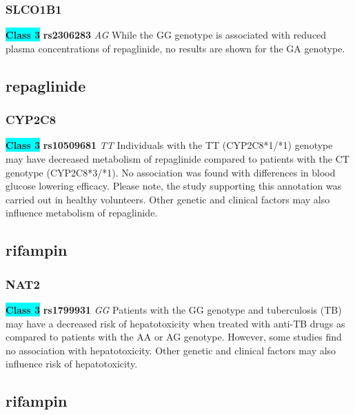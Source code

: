 \documentclass{book}
\begin{document}
\subsubsection{ SLCO1B1 }

\begin{center}
\textbf{\colorbox{cyan} {Class 3}} \textbf{ rs2306283 } \textit{ AG }
While the GG genotype is associated with reduced plasma concentrations of repaglinide, no results are shown for the GA genotype.


\end{center}\subsection{ repaglinide }


\subsubsection{ CYP2C8 }

\begin{center}
\textbf{\colorbox{cyan} {Class 3}} \textbf{ rs10509681 } \textit{ TT }
Individuals with the TT (CYP2C8*1/*1) genotype may have decreased metabolism of repaglinide compared to patients with the CT genotype (CYP2C8*3/*1). No association was found with differences in blood glucose lowering efficacy. Please note, the study supporting this annotation was carried out in healthy volunteers. Other genetic and clinical factors may also influence metabolism of repaglinide.


\end{center}\subsection{ rifampin }


\subsubsection{ NAT2 }

\begin{center}
\textbf{\colorbox{cyan} {Class 3}} \textbf{ rs1799931 } \textit{ GG }
Patients with the GG genotype and tuberculosis (TB) may have a decreased risk of hepatotoxicity when treated with anti-TB drugs as compared to patients with the AA or AG genotype. However, some studies find no association with hepatotoxicity. Other genetic and clinical factors may also influence risk of hepatotoxicity.


\end{center}\subsection{ rifampin }
\end{document}
